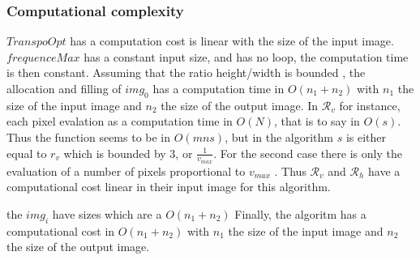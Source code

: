    \subsubsection{Computational complexity}
   
 $TranspoOpt$ has a computation cost is linear with the size of the input image. $frequenceMax$ has a constant input size, and has no loop, the computation time is then constant. Assuming that the ratio height/width is bounded , the allocation and filling of $img_0$ has a computation time in $O(n_1+n_2)$ with $n_1$ the size of the input image and $n_2$ the size of the output image.
  In ${\mathcal R}_v$ for instance, each pixel evalation as a computation time in $O(N)$, that is to say in $O(s)$. Thus the function seems to be in $O(mns)$, but in the algorithm $s$ is either equal to $r_v$ which is bounded by $3$, or $\frac{1}{v_{max}}$. For the second case there is only the evaluation of a number of pixels proportional to $v_{max}$ . Thus ${\mathcal R}_v$ and ${\mathcal R}_h$ have a computational cost linear in their input image for this algorithm.   

   
    the $img_i$ have sizes which are a $O(n_1+n_2)$
   \medbreak
   Finally, the algoritm has a computational cost in $O(n_1+n_2)$ with $n_1$ the size of the input image and $n_2$ the size of the output image.
